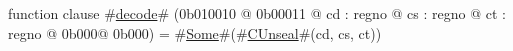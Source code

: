 function clause #\hyperref[zdecode]{decode}# (0b010010 @ 0b00011 @ cd : regno @ cs : regno @ ct : regno @ 0b000@ 0b000) = #\hyperref[zSome]{Some}#(#\hyperref[zCUnseal]{CUnseal}#(cd, cs, ct))
